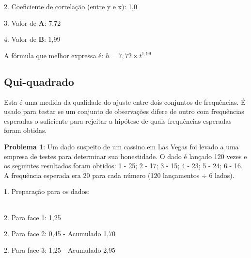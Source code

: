 2. Coeficiente de correlação (entre y e x): 1,0 \\
  

3. Valor de \textbf{A}: 7,72 \\
    

4. Valor de \textbf{B}: 1,99 \\
       
  \keystroke{$-$}

A fórmula que melhor expressa é: $h = 7,72 \times t^{1,99}$

\subsection*{Qui-quadrado}
Esta é uma medida da qualidade do ajuste entre dois conjuntos de frequências. É usado para testar se um conjunto de observações difere de outro com frequências esperadas o suficiente para rejeitar a hipótese de quais frequências esperadas foram obtidas.

\textbf{Problema 1}: Um dado suspeito de um cassino em Las Vegas foi levado a uma empresa de testes para determinar sua honestidade. O dado é lançado 120 vezes e os seguintes resultados foram obtidos: 1 - 25; 2 - 17; 3 - 15; 4 - 23; 5 - 24; 6 - 16. A frequência esperada era 20 para cada número (120 lançamentos $\div$ 6 lados).

1. Preparação para os dados: \\
  \\
   

2. Para face 1: 1,25 \\
     \keystroke{$-$}  \keystroke{$\times$}   \keystroke{$\div$}

2. Para face 2: 0,45 - Acumulado 1,70 \\
     \keystroke{$-$}  \keystroke{$\times$}   \keystroke{$\div$} \keystroke{$+$}

2. Para face 3: 1,25 - Acumulado 2,95 \\
     \keystroke{$-$}  \keystroke{$\times$}   \keystroke{$\div$} \keystroke{$+$}

